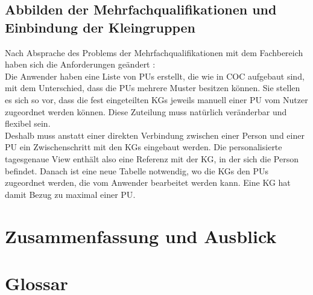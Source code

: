 \documentclass [12pt, a4paper, oneside, titlepage, ngerman]{article}
\begin{document}
\subsection{Abbilden der Mehrfachqualifikationen und Einbindung der Kleingruppen}
Nach Absprache des Problems der Mehrfachqualifikationen mit dem Fachbereich haben sich die Anforderungen geändert \cite[vgl.][]{Gespraech4}: \\
Die Anwender haben eine Liste von \acp{PU} erstellt, die wie in \ac{COC} aufgebaut sind, mit dem Unterschied, dass die \acp{PU} mehrere Muster besitzen können. Sie stellen es sich so vor, dass die fest eingeteilten \acp{KG} jeweils manuell einer \ac{PU} vom Nutzer zugeordnet werden können. Diese Zuteilung muss natürlich veränderbar und flexibel sein. \\
Deshalb muss anstatt einer direkten Verbindung zwischen einer Person und einer \ac{PU} ein Zwischenschritt mit den \acp{KG} eingebaut werden. Die personalisierte tagesgenaue View enthält also eine Referenz mit der \ac{KG}, in der sich die Person befindet. Danach ist eine neue Tabelle notwendig, wo die \acp{KG} den \acp{PU} zugeordnet werden, die vom Anwender bearbeitet werden kann. Eine \ac{KG} hat damit Bezug zu maximal einer \ac{PU}. \\

\newpage

\section {Zusammenfassung und Ausblick}
\newpage






\newpage

\setcounter{page}{4}
\section* {Glossar}
\end{document}
